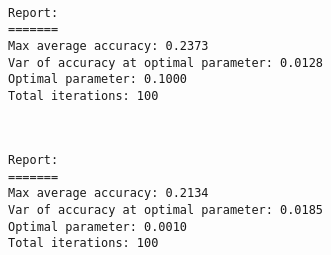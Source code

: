 \documentclass[11pt]{article}
\begin{document}
    \begin{center}
    \end{center}
    { \hspace*{\fill} \\}
    
    \begin{Verbatim}[commandchars=\\\{\}]
Report:
=======
Max average accuracy: 0.2373
Var of accuracy at optimal parameter: 0.0128
Optimal parameter: 0.1000
Total iterations: 100

    \end{Verbatim}

    \begin{center}
    \end{center}
    { \hspace*{\fill} \\}
    
    \begin{Verbatim}[commandchars=\\\{\}]
Report:
=======
Max average accuracy: 0.2134
Var of accuracy at optimal parameter: 0.0185
Optimal parameter: 0.0010
Total iterations: 100

    \end{Verbatim}
\end{document}
